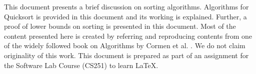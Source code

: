 This document presents a brief discussion on sorting algorithms. Algorithms for Quicksort is provided in this document and its working is explained. Further, a proof of lower bounds on sorting is presented in this document. Most of the content presented here is created by referring and reproducing contents from one of the widely followed book on Algorithms by Cormen et al. \cite{cormen}. We do not claim originality of this work. This document is prepared as part of an assignment for the Software Lab Course (CS251) to learn \LaTeX.
